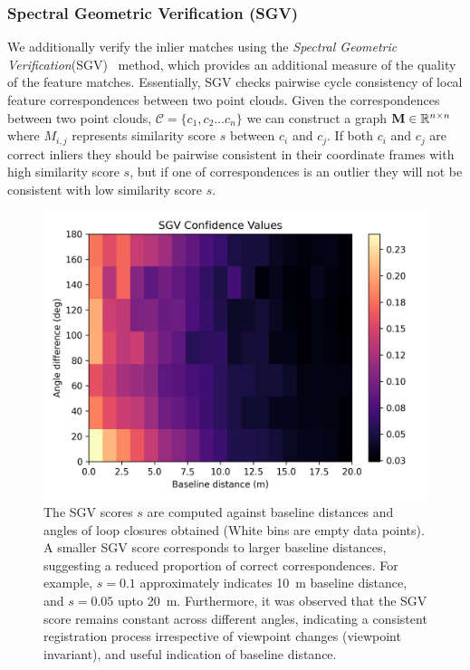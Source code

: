 \subsubsection*{\textbf{Spectral Geometric Verification (SGV)}}
We additionally verify the inlier matches using the \emph{Spectral Geometric Verification}(SGV)~\cite{vidanapathirana2023ral} method, which provides an additional measure of the quality of the feature matches. Essentially, SGV checks pairwise cycle consistency of local feature correspondences between two point clouds. Given the correspondences between two point clouds, $\mathcal{C}=\{c_1, c_2 \ldots c_n\}$ we can construct a graph $\mathbf{M} \in \mathbb{R}^{n \times n}$ where $M_{i,j}$ represents similarity score $s$ between $c_i$ and $c_j$. If both $c_i$ and $c_j$ are correct inliers they should be pairwise consistent in their coordinate frames with high similarity score $s$, but if one of correspondences is an outlier they will not be consistent with low similarity score $s$. 
\begin{figure}[t]
  \centering
  \includegraphics*[width=0.9\columnwidth]{pics/methods_svg_distance2.png}
  \caption{The SGV scores $s$ are computed against baseline distances and angles of loop closures obtained (White bins are empty data points). A smaller SGV score corresponds to larger baseline distances, suggesting a reduced proportion of correct correspondences. 
  For example, $s=0.1$ approximately indicates \SI{10}{\meter} baseline distance, and $s=0.05$ upto \SI{20}{\meter}. Furthermore, it was observed that the SGV score remains constant across different angles, indicating a consistent registration process irrespective of viewpoint changes (viewpoint invariant), and useful indication of baseline distance.}
  \label{fig:sgv_distance}
\end{figure}
